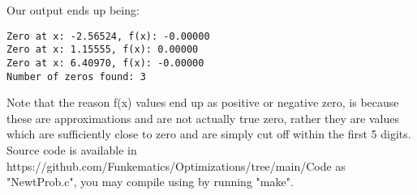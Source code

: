 \documentclass{article}
\begin{document}
Our output ends up being:
\begin{lstlisting}
Zero at x: -2.56524, f(x): -0.00000
Zero at x: 1.15555, f(x): 0.00000
Zero at x: 6.40970, f(x): -0.00000
Number of zeros found: 3
\end{lstlisting}
Note that the reason f(x) values end up as positive or negative zero, is because these are approximations and are not actually true zero, rather they are values which are sufficiently close to zero and are simply cut off within the first 5 digits. Source code is available in https://github.com/Funkematics/Optimizations/tree/main/Code as "NewtProb.c", you may compile using by running "make".
\end{document}
